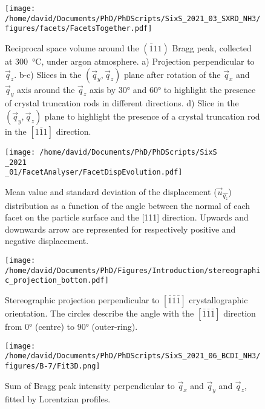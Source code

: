 \begin{figure}[!htb]
    \centering
    \texttt{[image: /home/david/Documents/PhD/PhDScripts/SixS\_2021\_03\_SXRD\_NH3/figures/facets/FacetsTogether.pdf]}
    \caption{
        Reciprocal space volume around the $(\bar{1}11)$ Bragg peak, collected at \qty{300}{\degreeCelsius}, under argon atmosphere.
        a) Projection perpendicular to $\vec{q}_z$.
        b-c) Slices in the $(\vec{q}_y, \vec{q}_z)$ plane after rotation of the $\vec{q}_x$ and $\vec{q}_y$ axis around the $\vec{q}_z$ axis by \ang{30} and \ang{60} to highlight the presence of crystal truncation rods in different directions.
        d) Slice in the $(\vec{q}_y, \vec{q}_z)$ plane to highlight the presence of a crystal truncation rod in the $[1\bar{1}1]$ direction.
    }
    \label{fig:FacetMapsNotPatched}
\end{figure}

\begin{figure}[!htb]
    \centering
    \texttt{[image: /home/david/Documents/PhD/PhDScripts/SixS\\\_2021\\\_01/FacetAnalyser/FacetDispEvolution.pdf]}
    \caption{
        Mean value and standard deviation of the displacement ($\vec{u}_{\hat{q_z}}$) distribution as a function of the angle between the normal of each facet on the particle surface and the [111] direction.
        Upwards and downwards arrow are represented for respectively positive and negative displacement.
    }
    \label{fig:AmaterasuDisplacement}
\end{figure}

\begin{figure}[!htb]
    \centering
    \texttt{[image: /home/david/Documents/PhD/Figures/Introduction/stereographic\_projection\_bottom.pdf]}
    \caption{
        Stereographic projection perpendicular to $[\bar{1}\bar{1}\bar{1}]$ crystallographic orientation.
        The circles describe the angle with the $[\bar{1}\bar{1}\bar{1}]$ direction from \ang{0} (centre) to \ang{90} (outer-ring).
    }
    \label{fig:StereoBottom}
\end{figure}

\begin{figure}[!htb]
    \centering
    \texttt{[image: /home/david/Documents/PhD/PhDScripts/SixS\_2021\_06\_BCDI\_NH3/figures/B-7/Fit3D.png]}
    \caption{
        Sum of Bragg peak intensity perpendicular to $\vec{q}_x$ and $\vec{q}_y$ and $\vec{q}_z$, fitted by Lorentzian profiles.
    }
    \label{fig:FitB73D}
\end{figure}

